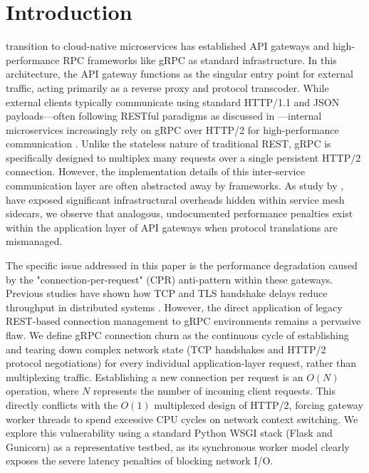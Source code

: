 \documentclass{ieeeaccess}
\begin{document}
\titlepgskip=-21pt

\maketitle


\section{Introduction}
\label{sec:introduction}

 transition to cloud-native microservices has established API gateways and high-performance RPC frameworks like gRPC as standard infrastructure. In this architecture, the API gateway functions as the singular entry point for external traffic, acting primarily as a reverse proxy and protocol transcoder. While external clients typically communicate using standard HTTP/1.1 and JSON payloads—often following RESTful paradigms as discussed in \cite{martin2022online}—internal microservices increasingly rely on gRPC over HTTP/2 for high-performance communication \cite{Ventre2018SDNAAA}. Unlike the stateless nature of traditional REST, gRPC is specifically designed to multiplex many requests over a single persistent HTTP/2 connection. However, the implementation details of this inter-service communication layer are often abstracted away by frameworks. As study by \cite{zhu2023dissecting}, have exposed significant infrastructural overheads hidden within service mesh sidecars, we observe that analogous, undocumented performance penalties exist within the application layer of API gateways when protocol translations are mismanaged.

The specific issue addressed in this paper is the performance degradation caused by the "connection-per-request" (CPR) anti-pattern within these gateways. Previous studies have shown how TCP and TLS handshake delays reduce throughput in distributed systems \cite{Guo2020StatefulTCPANAA}. However, the direct application of legacy REST-based connection management to gRPC environments remains a pervasive flaw. We define gRPC connection churn as the continuous cycle of establishing and tearing down complex network state (TCP handshakes and HTTP/2 protocol negotiations) for every individual application-layer request, rather than multiplexing traffic. Establishing a new connection per request is an $O(N)$ operation, where $N$ represents the number of incoming client requests. This directly conflicts with the $O(1)$ multiplexed design of HTTP/2, forcing gateway worker threads to spend excessive CPU cycles on network context switching. We explore this vulnerability using a standard Python WSGI stack \cite{wsgi-pep} (Flask and Gunicorn) as a representative testbed, as its synchronous worker model clearly exposes the severe latency penalties of blocking network I/O.
\end{document}
